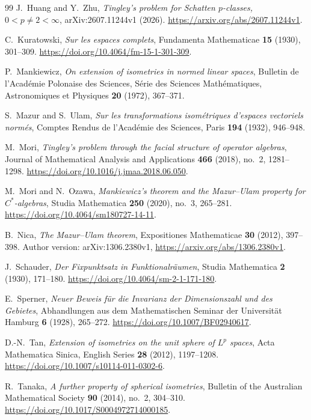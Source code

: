 \begin{thebibliography}{99}
J.~Huang and Y.~Zhu,
\emph{Tingley's problem for Schatten $p$-classes, $0<p\ne2<\infty$},
arXiv:2607.11244v1 (2026).
\url{https://arxiv.org/abs/2607.11244v1}.

C.~Kuratowski,
\emph{Sur les espaces complets},
Fundamenta Mathematicae \textbf{15} (1930), 301--309.
\url{https://doi.org/10.4064/fm-15-1-301-309}.

P.~Mankiewicz,
\emph{On extension of isometries in normed linear spaces},
Bulletin de l'Acad\'emie Polonaise des Sciences,
S\'erie des Sciences Math\'ematiques, Astronomiques et Physiques
\textbf{20} (1972), 367--371.

S.~Mazur and S.~Ulam,
\emph{Sur les transformations isom\'etriques d'espaces vectoriels norm\'es},
Comptes Rendus de l'Acad\'emie des Sciences, Paris
\textbf{194} (1932), 946--948.

M.~Mori,
\emph{Tingley's problem through the facial structure of operator algebras},
Journal of Mathematical Analysis and Applications \textbf{466} (2018), no.~2, 1281--1298.
\url{https://doi.org/10.1016/j.jmaa.2018.06.050}.

M.~Mori and N.~Ozawa,
\emph{Mankiewicz's theorem and the Mazur--Ulam property for $C^*$-algebras},
Studia Mathematica \textbf{250} (2020), no.~3, 265--281.
\url{https://doi.org/10.4064/sm180727-14-11}.

B.~Nica,
\emph{The Mazur--Ulam theorem},
Expositiones Mathematicae \textbf{30} (2012), 397--398.
Author version: arXiv:1306.2380v1,
\url{https://arxiv.org/abs/1306.2380v1}.

J.~Schauder,
\emph{Der Fixpunktsatz in Funktionalr\"aumen},
Studia Mathematica \textbf{2} (1930), 171--180.
\url{https://doi.org/10.4064/sm-2-1-171-180}.

E.~Sperner,
\emph{Neuer Beweis f\"ur die Invarianz der Dimensionszahl und des Gebietes},
Abhandlungen aus dem Mathematischen Seminar der Universit\"at Hamburg
\textbf{6} (1928), 265--272.
\url{https://doi.org/10.1007/BF02940617}.

D.-N.~Tan,
\emph{Extension of isometries on the unit sphere of $L^p$ spaces},
Acta Mathematica Sinica, English Series \textbf{28} (2012), 1197--1208.
\url{https://doi.org/10.1007/s10114-011-0302-6}.

R.~Tanaka,
\emph{A further property of spherical isometries},
Bulletin of the Australian Mathematical Society \textbf{90} (2014), no.~2, 304--310.
\url{https://doi.org/10.1017/S0004972714000185}.


\end{thebibliography}
